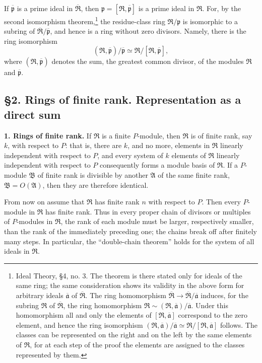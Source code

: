 \documentclass[11pt]{article}
\begin{document}
If $\overline{\mathfrak p}$ is a prime ideal in $\overline{\mathfrak R}$, then $\mathfrak p=[\mathfrak R,\overline{\mathfrak p}]$ is a prime ideal in $\mathfrak R$. For, by the second isomorphism theorem,\footnote{Ideal Theory, \S 4, no. 3. The theorem is there stated only for ideals of the same ring; the same consideration shows its validity in the above form for arbitrary ideals $\overline{\mathfrak a}$ of $\overline{\mathfrak R}$. The ring homomorphism $\overline{\mathfrak R}\to\overline{\mathfrak R}/\overline{\mathfrak a}$ induces, for the subring $\mathfrak R$ of $\overline{\mathfrak R}$, the ring homomorphism $\mathfrak R\sim(\mathfrak R,\overline{\mathfrak a})/\overline{\mathfrak a}$. Under this homomorphism all and only the elements of $[\mathfrak R,\overline{\mathfrak a}]$ correspond to the zero element, and hence the ring isomorphism $(\mathfrak R,\overline{\mathfrak a})/\overline{\mathfrak a}\simeq \mathfrak R/[\mathfrak R,\overline{\mathfrak a}]$ follows. The classes can be represented on the right and on the left by the same elements of $\mathfrak R$, for at each step of the proof the elements are assigned to the classes represented by them.} the residue-class ring $\mathfrak R/\mathfrak p$ is isomorphic to a subring of $\overline{\mathfrak R}/\overline{\mathfrak p}$, and hence is a ring without zero divisors. Namely, there is the ring isomorphism
\[
   (\mathfrak R,\overline{\mathfrak p})/\overline{\mathfrak p}
   \simeq \mathfrak R/[\mathfrak R,\overline{\mathfrak p}],
\]
where $(\mathfrak R,\overline{\mathfrak p})$ denotes the sum, the greatest common divisor, of the modules $\mathfrak R$ and $\overline{\mathfrak p}$.

\subsection*{\S 2. Rings of finite rank. Representation as a direct sum}

\textbf{1. Rings of finite rank.} If $\mathfrak R$ is a finite $P$-module, then $\mathfrak R$ is of finite rank, say $k$, with respect to $P$: that is, there are $k$, and no more, elements in $\mathfrak R$ linearly independent with respect to $P$, and every system of $k$ elements of $\mathfrak R$ linearly independent with respect to $P$ consequently forms a module basis of $\mathfrak R$. If a $P$-module $\mathfrak B$ of finite rank is divisible by another $\mathfrak A$ of the same finite rank, $\mathfrak B=O(\mathfrak A)$, then they are therefore identical.

From now on assume that $\mathfrak R$ has finite rank $n$ with respect to $P$. Then every $P$-module in $\mathfrak R$ has finite rank. Thus in every proper chain of divisors or multiples of $P$-modules in $\mathfrak R$, the rank of each module must be larger, respectively smaller, than the rank of the immediately preceding one; the chains break off after finitely many steps. In particular, the ``double-chain theorem'' holds for the system of all ideals in $\mathfrak R$.
\end{document}
